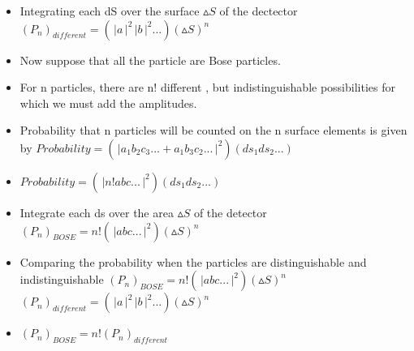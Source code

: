 \documentclass[aspectratio=169]{beamer}
\begin{document}
\begin{frame}
	\begin{itemize}
		\item Integrating each dS over the surface $\vartriangle S$ of the dectector \newline 
		$(P_{n})_{different} = \left(\,\Bigr\rvert a \,\Bigr\rvert^{2}\,\Bigr\rvert b \,\Bigr\rvert^{2}...\right)(\vartriangle S)^{n}$ \newline
		\item Now suppose that all the particle are Bose particles.
		\item For n particles, there are n! different , but indistinguishable  possibilities for which we must add the amplitudes. \newline
	\end{itemize}
\end{frame}

\begin{frame}
	\begin{itemize}
	\item Probability that n particles will be counted on the n surface elements is given by \newline $Probability = \left(\,\Bigr\rvert a_{1}b_{2}c_{3}... + a_{1}b_{3}c_{2}... \,\Bigr\rvert^{2}\right)(ds_{1}ds_{2}...)$
	\item $Probability = \left(\,\Bigr\rvert n!abc... \,\Bigr\rvert^{2}\right)(ds_{1}ds_{2}...)$
	\item Integrate each ds over the area $\vartriangle S$ of the detector \newline
	$(P_{n})_{BOSE} = n!\left(\,\Bigr\rvert abc... \,\Bigr\rvert^{2}\right)(\vartriangle S)^{n}$
	\end{itemize}
\end{frame}

\begin{frame}
	\begin{itemize}
	\item Comparing the probability when the particles are distinguishable and indistinguishable \newline
	$(P_{n})_{BOSE} = n!\left(\,\Bigr\rvert abc... \,\Bigr\rvert^{2}\right)(\vartriangle S)^{n}$ \newline
	$(P_{n})_{different} = \left(\,\Bigr\rvert a \,\Bigr\rvert^{2}\,\Bigr\rvert b \,\Bigr\rvert^{2}...\right)(\vartriangle S)^{n}$ 
	\item $(P_{n})_{BOSE} = n!(P_{n})_{different}$
	\end{itemize}
\end{frame}
\end{document}

